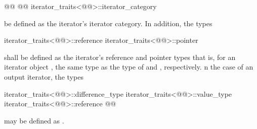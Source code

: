 %
\begin{codeblock}
@@
@@
iterator_traits<@@>::iterator_category
\end{codeblock}

be defined as the iterator's  iterator category.
In addition, the types

%
%
\begin{codeblock}
iterator_traits<@@>::reference
iterator_traits<@@>::pointer
\end{codeblock}

shall be defined as the iterator's reference and pointer types\oldtxt{,}\newtxt{;} that is, for an
iterator object , the same type as the type of  and ,
respectively. n the case of an output iterator, the types

\begin{codeblock}
iterator_traits<@@>::difference_type
iterator_traits<@@>::value_type
iterator_traits<@@>::reference
@@
\end{codeblock}

may be defined as .

